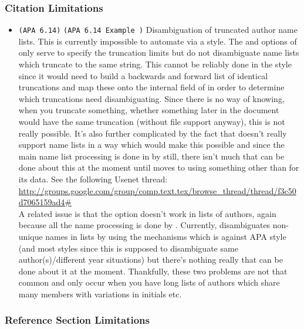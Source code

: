 \documentclass{ltxdockit}
\newcommand\apa[2][]{\ifthenelse{\equal{#1}{}}%
                       {\texttt{(APA #2)}}%
                       {\texttt{(APA #2 Example #1)}}}
\begin{document}
\subsubsection{Citation Limitations}

\begin{itemize}
\item \apa{6.14} Disambiguation of truncated author name lists. This is
  currently impossible to automate via a  style. The
   and  options of  only serve to
  specify the truncation limits but do not disambiguate name lists which
  truncate to the same string. This cannot be reliably done in the style
  since it would need to build a backwards and forward list of identical
  truncations and map these onto the internal  field of
   in order to determine which truncations need
  disambiguating. Since there is no way of knowing, when you truncate
  something, whether something later in the document would have the same
  truncation (without  file support anyway), this is not really
  possible. It's also further complicated by the fact that \bibtex doesn't
  really support name lists in a way which would make this possible and
  since the main name list processing is done in  by \bibtex
  still, there isn't much that can be done about this at the moment until
   moves to using something other than \bibtex for its data.
  See the following Usenet thread:\\

  \url{http://groups.google.com/group/comp.text.tex/browse_thread/thread/f3c50d7065159ad4#}\\

  A related issue is that the  option doesn't work in lists
  of authors, again because all the name processing is done by \bibtex.
  Currently,  disambiguates non-unique names in lists by
  using the  mechanisms which is against APA style (and most
  styles since this is supposed to disambiguate same author(s)/different
  year situations) but there's nothing really that can be done about it at
  the moment. Thankfully, these two problems are not that common and only
  occur when you have long lists of authors which share many members with
  variations in initials etc.
\end{itemize}

\subsubsection{Reference Section Limitations}
\end{document}
